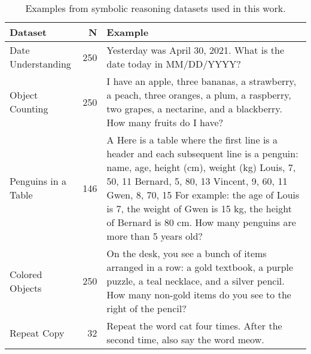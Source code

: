 \begin{table}[ht!]
\centering
\caption{Examples from symbolic reasoning datasets used in this work.}
\begin{tabular}{@{}lrp{6.5cm}@{}}
\toprule
Dataset   & N     & Example                                                                                                \\ 
\midrule
Date Understanding     & 250 & Yesterday was April 30, 2021. What is the date today in MM/DD/YYYY? \\
Object Counting        & 250  & I have an apple, three bananas, a strawberry, a peach, three oranges, a plum, a raspberry, two grapes, a nectarine, and a blackberry. How many fruits do I have? \\
Penguins in a Table    & 146 & A Here is a table where the first line is a header and each subsequent line is a penguin:  name, age, height (cm), weight (kg) Louis, 7, 50, 11 Bernard, 5, 80, 13 Vincent, 9, 60, 11 Gwen, 8, 70, 15  For example: the age of Louis is 7, the weight of Gwen is 15 kg, the height of Bernard is 80 cm.  How many penguins are more than 5 years old? \\
Colored Objects        & 250 & On the desk, you see a bunch of items arranged in a row: a gold textbook, a purple puzzle, a teal necklace, and a silver pencil. How many non-gold items do you see to the right of the pencil? \\
Repeat Copy            & 32   & Repeat the word cat four times. After the second time, also say the word meow. \\
\bottomrule
\end{tabular}
\label{tab:bbh:examples}
\end{table}
